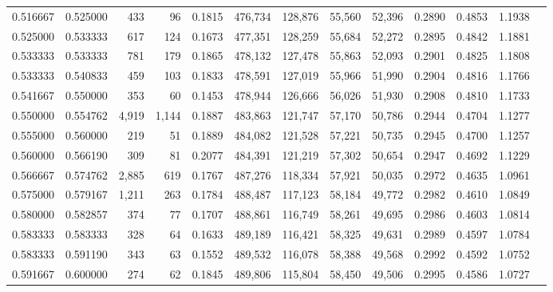 \begin{tabular}{rrrrrrrrrrrrr}
0.516667 & 0.525000 &    433 &     96 &                                     0.1815 & 476,734 & 128,876 &  55,560 &  52,396 & 0.2890 & 0.4853 & 1.1938 \\
0.525000 & 0.533333 &    617 &    124 &                                     0.1673 & 477,351 & 128,259 &  55,684 &  52,272 & 0.2895 & 0.4842 & 1.1881 \\
0.533333 & 0.533333 &    781 &    179 &                                     0.1865 & 478,132 & 127,478 &  55,863 &  52,093 & 0.2901 & 0.4825 & 1.1808 \\
0.533333 & 0.540833 &    459 &    103 &                                     0.1833 & 478,591 & 127,019 &  55,966 &  51,990 & 0.2904 & 0.4816 & 1.1766 \\
0.541667 & 0.550000 &    353 &     60 &                                     0.1453 & 478,944 & 126,666 &  56,026 &  51,930 & 0.2908 & 0.4810 & 1.1733 \\
0.550000 & 0.554762 &  4,919 &  1,144 &                                     0.1887 & 483,863 & 121,747 &  57,170 &  50,786 & 0.2944 & 0.4704 & 1.1277 \\
0.555000 & 0.560000 &    219 &     51 &                                     0.1889 & 484,082 & 121,528 &  57,221 &  50,735 & 0.2945 & 0.4700 & 1.1257 \\
0.560000 & 0.566190 &    309 &     81 &                                     0.2077 & 484,391 & 121,219 &  57,302 &  50,654 & 0.2947 & 0.4692 & 1.1229 \\
0.566667 & 0.574762 &  2,885 &    619 &                                     0.1767 & 487,276 & 118,334 &  57,921 &  50,035 & 0.2972 & 0.4635 & 1.0961 \\
0.575000 & 0.579167 &  1,211 &    263 &                                     0.1784 & 488,487 & 117,123 &  58,184 &  49,772 & 0.2982 & 0.4610 & 1.0849 \\
0.580000 & 0.582857 &    374 &     77 &                                     0.1707 & 488,861 & 116,749 &  58,261 &  49,695 & 0.2986 & 0.4603 & 1.0814 \\
0.583333 & 0.583333 &    328 &     64 &                                     0.1633 & 489,189 & 116,421 &  58,325 &  49,631 & 0.2989 & 0.4597 & 1.0784 \\
0.583333 & 0.591190 &    343 &     63 &                                     0.1552 & 489,532 & 116,078 &  58,388 &  49,568 & 0.2992 & 0.4592 & 1.0752 \\
0.591667 & 0.600000 &    274 &     62 &                                     0.1845 & 489,806 & 115,804 &  58,450 &  49,506 & 0.2995 & 0.4586 & 1.0727 \\

\end{tabular}
